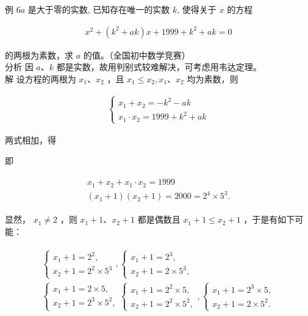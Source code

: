 \documentclass[10pt]{article}
\begin{document}
例 $6 a$ 是大于零的实数, 已知存在唯一的实数 $k$, 使得关于 $x$ 的方程

\begin{align*}
x^{2}+\left(k^{2}+a k\right) x+1999+k^{2}+a k=0
\end{align*}

的两根为素数，求 $a$ 的值。（全国初中数学竞赛）\\
分析 因 $a 、 k$ 都是实数，故用判别式较难解决，可考虑用韦达定理。\\
解 设方程的两根为 $x_{1} 、 x_{2}$ ，且 $x_{1} \leqslant x_{2}, x_{1} 、 x_{2}$ 均为素数，则

\begin{align*}
\left\{\begin{array}{l}
x_{1}+x_{2}=-k^{2}-a k \\
x_{1} \cdot x_{2}=1999+k^{2}+a k
\end{array}\right.
\end{align*}

两式相加，得

即

\begin{align*}
\begin{gathered}
x_{1}+x_{2}+x_{1} \cdot x_{2}=1999 \\
\left(x_{1}+1\right)\left(x_{2}+1\right)=2000=2^{4} \times 5^{3} .
\end{gathered}
\end{align*}

显然， $x_{1} \neq 2$ ，则 $x_{1}+1 、 x_{2}+1$ 都是偶数且 $x_{1}+1 \leqslant x_{2}+1$ ，于是有如下可能：

\begin{align*}
\begin{gathered}
\left\{\begin{array}{l}
x_{1}+1=2^{2}, \\
x_{2}+1=2^{2} \times 5^{3}
\end{array},\left\{\begin{array}{l}
x_{1}+1=2^{3}, \\
x_{2}+1=2 \times 5^{3},
\end{array}\right.\right. \\
\left\{\begin{array} { l } 
{ x _ { 1 } + 1 = 2 \times 5 , } \\
{ x _ { 2 } + 1 = 2 ^ { 3 } \times 5 ^ { 2 } , }
\end{array} \left\{\begin{array}{l}
x_{1}+1=2^{2} \times 5, \\
x_{2}+1=2^{2} \times 5^{2},
\end{array},\left\{\begin{array}{l}
x_{1}+1=2^{3} \times 5, \\
x_{2}+1=2 \times 5^{2} .
\end{array}\right.\right.\right.
\end{gathered}
\end{align*}
\end{document}
